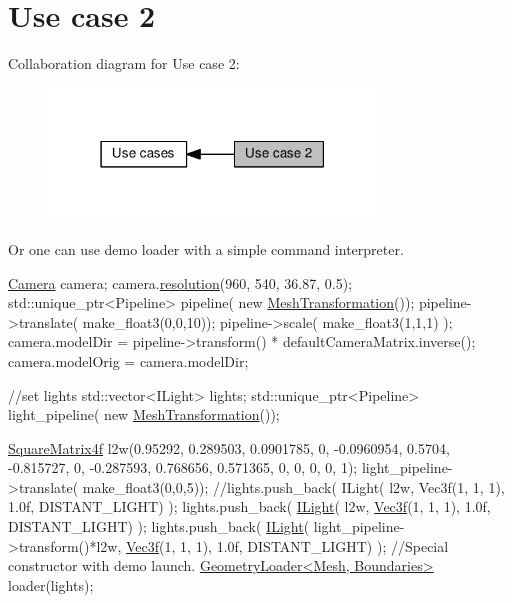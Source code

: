 \hypertarget{group__usecase2}{}\section{Use case 2}
\label{group__usecase2}
Collaboration diagram for Use case 2\+:\nopagebreak
\begin{figure}[H]
\begin{center}
\leavevmode
\includegraphics[width=247pt]{group__usecase2}
\end{center}
\end{figure}
Or one can use demo loader with a simple command interpreter.  
\begin{DoxyCode}
    \hyperlink{struct_camera}{Camera} camera;
camera.\hyperlink{struct_camera_ab0cbf1b102afdeb285ef2be271d1701c}{resolution}(960, 540, 36.87, 0.5);
std::unique\_ptr<Pipeline> pipeline( \textcolor{keyword}{new} \hyperlink{class_mesh_transformation}{MeshTransformation}());
pipeline->translate( make\_float3(0,0,10));
pipeline->scale( make\_float3(1,1,1) );
camera.modelDir = pipeline->transform() * defaultCameraMatrix.inverse();
camera.modelOrig = camera.modelDir;

\textcolor{comment}{//set lights}
std::vector<ILight> lights;
std::unique\_ptr<Pipeline> light\_pipeline( \textcolor{keyword}{new} \hyperlink{class_mesh_transformation}{MeshTransformation}());

\hyperlink{class_square_matrix4}{SquareMatrix4f} l2w(0.95292, 0.289503, 0.0901785, 0,
     -0.0960954, 0.5704, -0.815727, 0,
     -0.287593, 0.768656, 0.571365, 0,
         0, 0, 0, 1);
light\_pipeline->translate( make\_float3(0,0,5));
\textcolor{comment}{//lights.push\_back( ILight( l2w, Vec3f(1, 1, 1), 1.0f, DISTANT\_LIGHT) );}
lights.push\_back( \hyperlink{class_i_light}{ILight}( l2w, \hyperlink{class_vec3}{Vec3f}(1, 1, 1), 1.0f, DISTANT\_LIGHT) );
lights.push\_back( \hyperlink{class_i_light}{ILight}( light\_pipeline->transform()*l2w, \hyperlink{class_vec3}{Vec3f}(1, 1, 1), 1.0f, DISTANT\_LIGHT) 
      );
\textcolor{comment}{//Special constructor with demo launch.}
\hyperlink{class_geometry_loader}{GeometryLoader<Mesh, Boundaries>} loader(lights);
\end{DoxyCode}
 
